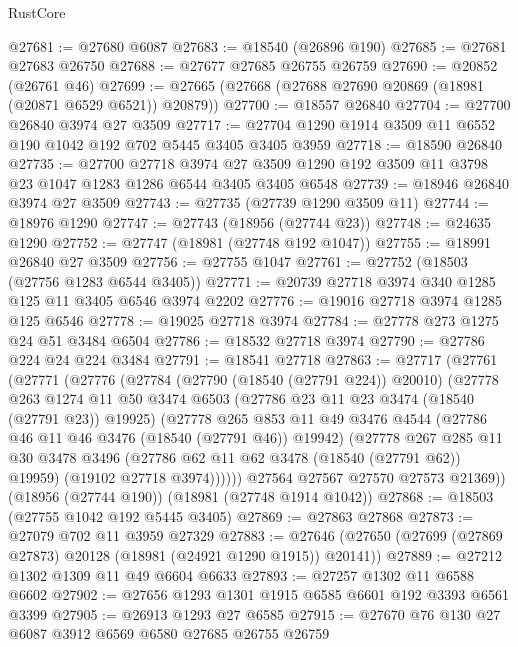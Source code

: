 \begin{lexlean}{RustCore}
\begin{coremodule}
@27681 := @27680 @6087
@27683 := @18540 (@26896 @190)
@27685 := @27681 @27683 @26750
@27688 := @27677 @27685 @26755 @26759
@27690 := @20852 (@26761 @46)
@27699 := @27665 (@27668 (@27688 @27690 @20869 (@18981 (@20871 @6529 @6521)) @20879))
@27700 := @18557 @26840
@27704 := @27700 @26840 @3974 @27 @3509
@27717 := @27704 @1290 @1914 @3509 @11 @6552 @190 @1042 @192 @702 @5445 @3405 @3405 @3959
@27718 := @18590 @26840
@27735 := @27700
    @27718
    @3974
    @27
    @3509
    @1290
    @192
    @3509
    @11
    @3798
    @23
    @1047
    @1283
    @1286
    @6544
    @3405
    @3405
    @6548
@27739 := @18946 @26840 @3974 @27 @3509
@27743 := @27735 (@27739 @1290 @3509 @11)
@27744 := @18976 @1290
@27747 := @27743 (@18956 (@27744 @23))
@27748 := @24635 @1290
@27752 := @27747 (@18981 (@27748 @192 @1047))
@27755 := @18991 @26840 @27 @3509
@27756 := @27755 @1047
@27761 := @27752 (@18503 (@27756 @1283 @6544 @3405))
@27771 := @20739 @27718 @3974 @340 @1285 @125 @11 @3405 @6546 @3974 @2202
@27776 := @19016 @27718 @3974 @1285 @125 @6546
@27778 := @19025 @27718 @3974
@27784 := @27778 @273 @1275 @24 @51 @3484 @6504
@27786 := @18532 @27718 @3974
@27790 := @27786 @224 @24 @224 @3484
@27791 := @18541 @27718
@27863 := @27717
    (@27761
      (@27771
        (@27776
          (@27784
            (@27790 (@18540 (@27791 @224)) @20010)
            (@27778
              @263
              @1274
              @11
              @50
              @3474
              @6503
              (@27786 @23 @11 @23 @3474 (@18540 (@27791 @23)) @19925)
              (@27778
                @265
                @853
                @11
                @49
                @3476
                @4544
                (@27786 @46 @11 @46 @3476 (@18540 (@27791 @46)) @19942)
                (@27778
                  @267
                  @285
                  @11
                  @30
                  @3478
                  @3496
                  (@27786 @62 @11 @62 @3478 (@18540 (@27791 @62)) @19959)
                  (@19102 @27718 @3974))))))
        @27564
        @27567
        @27570
        @27573
        @21369))
    (@18956 (@27744 @190))
    (@18981 (@27748 @1914 @1042))
@27868 := @18503 (@27755 @1042 @192 @5445 @3405)
@27869 := @27863 @27868
@27873 := @27079 @702 @11 @3959 @27329
@27883 := @27646 (@27650 (@27699 (@27869 @27873) @20128 (@18981 (@24921 @1290 @1915)) @20141))
@27889 := @27212 @1302 @1309 @11 @49 @6604 @6633
@27893 := @27257 @1302 @11 @6588 @6602
@27902 := @27656 @1293 @1301 @1915 @6585 @6601 @192 @3393 @6561 @3399
@27905 := @26913 @1293 @27 @6585
@27915 := @27670 @76 @130 @27 @6087 @3912 @6569 @6580 @27685 @26755 @26759

\end{coremodule}
\end{lexlean}
